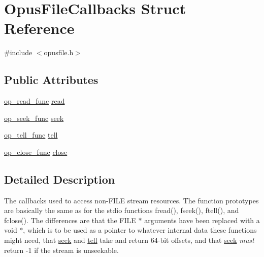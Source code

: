 \hypertarget{struct_opus_file_callbacks}{}\section{Opus\+File\+Callbacks Struct Reference}
\label{struct_opus_file_callbacks}


{\ttfamily \#include $<$opusfile.\+h$>$}

\subsection*{Public Attributes}
\begin{DoxyCompactItemize}
\item 
\mbox{\hyperlink{group__stream__callbacks_ga9ffca429db1f3b77f2f303f1942188c3}{op\+\_\+read\+\_\+func}} \mbox{\hyperlink{struct_opus_file_callbacks_a602ea09a84743a8f4fdc76ab7c0b6ee6}{read}}
\item 
\mbox{\hyperlink{group__stream__callbacks_gae57cb396d1f193d3f4e7e56ddad7760e}{op\+\_\+seek\+\_\+func}} \mbox{\hyperlink{struct_opus_file_callbacks_acf98bb1d13f75d3770206a398be05c8f}{seek}}
\item 
\mbox{\hyperlink{group__stream__callbacks_gaca012812dea4bc3a27b0c23575efecaf}{op\+\_\+tell\+\_\+func}} \mbox{\hyperlink{struct_opus_file_callbacks_a1464ae2f33850101add14a7eb278ff1c}{tell}}
\item 
\mbox{\hyperlink{group__stream__callbacks_ga16c914ec90d301f125cdbeaa1ff57c2d}{op\+\_\+close\+\_\+func}} \mbox{\hyperlink{struct_opus_file_callbacks_a04548cff8eda8ab0322f47cb702fe889}{close}}
\end{DoxyCompactItemize}


\subsection{Detailed Description}
The callbacks used to access non-\/{\ttfamily F\+I\+LE} stream resources. The function prototypes are basically the same as for the stdio functions {\ttfamily fread()}, {\ttfamily fseek()}, {\ttfamily ftell()}, and {\ttfamily fclose()}. The differences are that the {\ttfamily F\+I\+LE $\ast$} arguments have been replaced with a {\ttfamily void $\ast$}, which is to be used as a pointer to whatever internal data these functions might need, that \mbox{\hyperlink{struct_opus_file_callbacks_acf98bb1d13f75d3770206a398be05c8f}{seek}} and \mbox{\hyperlink{struct_opus_file_callbacks_a1464ae2f33850101add14a7eb278ff1c}{tell}} take and return 64-\/bit offsets, and that \mbox{\hyperlink{struct_opus_file_callbacks_acf98bb1d13f75d3770206a398be05c8f}{seek}} {\itshape must} return -\/1 if the stream is unseekable. 

